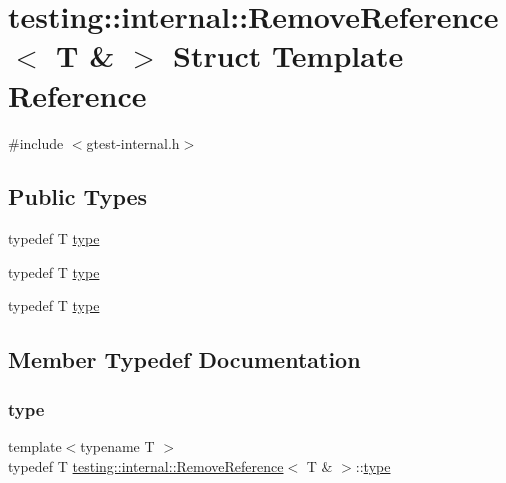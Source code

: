 \hypertarget{structtesting_1_1internal_1_1_remove_reference_3_01_t_01_6_01_4}{}\section{testing\+::internal\+::Remove\+Reference$<$ T \& $>$ Struct Template Reference}
\label{structtesting_1_1internal_1_1_remove_reference_3_01_t_01_6_01_4}


{\ttfamily \#include $<$gtest-\/internal.\+h$>$}

\subsection*{Public Types}
\begin{DoxyCompactItemize}
\item 
typedef T \mbox{\hyperlink{structtesting_1_1internal_1_1_remove_reference_3_01_t_01_6_01_4_a3d0f32a66759f333c2dd66aa31005e6d}{type}}
\item 
typedef T \mbox{\hyperlink{structtesting_1_1internal_1_1_remove_reference_3_01_t_01_6_01_4_a3d0f32a66759f333c2dd66aa31005e6d}{type}}
\item 
typedef T \mbox{\hyperlink{structtesting_1_1internal_1_1_remove_reference_3_01_t_01_6_01_4_a3d0f32a66759f333c2dd66aa31005e6d}{type}}
\end{DoxyCompactItemize}


\subsection{Member Typedef Documentation}
\mbox{\label{structtesting_1_1internal_1_1_remove_reference_3_01_t_01_6_01_4_a3d0f32a66759f333c2dd66aa31005e6d}} 
\subsubsection{\texorpdfstring{type}{type}\hspace{0.1cm}{\footnotesize\ttfamily [1/3]}}
{\footnotesize\ttfamily template$<$typename T $>$ \\
typedef T \mbox{\hyperlink{structtesting_1_1internal_1_1_remove_reference}{testing\+::internal\+::\+Remove\+Reference}}$<$ T \& $>$\+::\mbox{\hyperlink{structtesting_1_1internal_1_1_remove_reference_3_01_t_01_6_01_4_a3d0f32a66759f333c2dd66aa31005e6d}{type}}}

